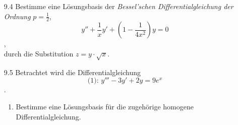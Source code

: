 \documentclass{../HM}
\begin{document}
\begin{enumerate}
		\item [9.4] Bestimme eine Lösungsbasis der \textit{Bessel'schen Differentialgleichung der Ordnung} $p=\frac{1}{2}$,
		$$y''+\frac{1}{x}y'+(1-\frac{1}{4x^2})y=0$$,\\
		durch die Substitution $z=y\cdot\sqrt{x}$.
		
		\begin{eqnn}
			\eqnspace
		\end{eqnn}
		
		\item [9.5] Betrachtet wird die Differentialgleichung
		$$\text{(1): }y'''-3y'+2y=9e^x$$.\\
		
		\begin{enumerate}
			\item Bestimme eine Lösungsbasis für die zugehörige homogene Differentialgleichung.
			

\end{enumerate}
\end{enumerate}
\end{document}
